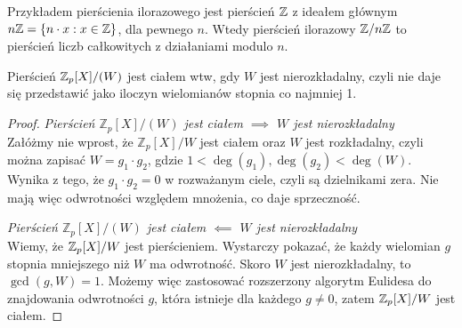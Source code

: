 Przykładem pierścienia ilorazowego jest pierścień \( \mathbb{Z} \) z ideałem głównym \( n \integer = \set{n \cdot x : x \in \integer} \), dla pewnego \( n \). Wtedy pierścień ilorazowy \( \mathbb{Z} / n\mathbb{Z} \) to pierścień liczb całkowitych z działaniami modulo \( n \).
\begin{theorem}
Pierścień \( \mathbb{Z}_p[X]/(W) \) jest ciałem wtw, gdy \( W \) jest nierozkładalny, czyli nie daje się przedstawić jako iloczyn wielomianów stopnia co najmniej 1.
\end{theorem}
\begin{proof}
    \textit{Pierścień \( \mathbb{Z}_p[X]/(W) \) jest ciałem \( \implies \) \( W \) jest nierozkładalny} \\
    Załóżmy nie wprost, że \( \mathbb{Z}_p[X]/W \) jest ciałem oraz \( W \) jest rozkładalny, czyli można zapisać \( W = g_1 \cdot g_2 \), gdzie \( 1 < \deg(g_1), \deg(g_2) < \deg(W) \). Wynika z tego, że \( g_1 \cdot g_2 = 0 \) w rozważanym ciele, czyli są dzielnikami zera. Nie mają więc odwrotności względem mnożenia, co daje sprzeczność.

    \textit{Pierścień \( \mathbb{Z}_p[X]/(W) \) jest ciałem \( \impliedby \) \( W \) jest nierozkładalny} \\
    Wiemy, że \( \mathbb{Z}_p[X]/W \) jest pierścieniem. Wystarczy pokazać, że każdy wielomian \( g \) stopnia mniejszego niż \( W \) ma odwrotność.
    Skoro \( W \) jest nierozkładalny, to \( \gcd(g, W) = 1 \). Możemy więc zastosować rozszerzony algorytm Eulidesa do znajdowania odwrotności \( g \), która istnieje dla każdego \( g \neq 0 \), zatem \( \mathbb{Z}_p[X]/W \) jest ciałem.
\end{proof}